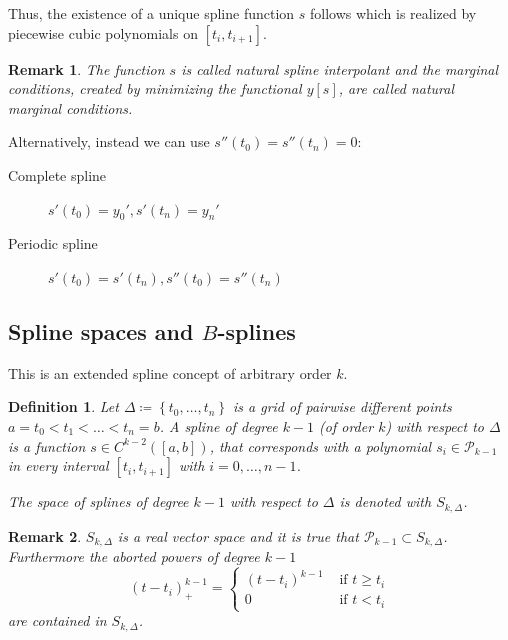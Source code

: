 \documentclass[a4paper]{article}
\newcounter{lecref}[section]
\numberwithin{lecref}{section}
\theoremstyle{break}
\newtheorem{definition}[lecref]{Definition}
\newtheorem*{Remark}{Remark}
\newcommand{\Set}[1]{\left\{#1\right\}}
\begin{document}
Thus, the existence of a unique spline function $s$ follows which is realized by piecewise cubic polynomials on $[t_i, t_{i+1}]$.

\begin{Remark}
  The function $s$ is called \emph{natural spline interpolant} and the marginal conditions, created by minimizing the functional $y[s]$, are called \emph{natural marginal conditions}.
\end{Remark}

Alternatively, instead we can use $s''(t_0) = s''(t_n) = 0$:
\begin{description}
  \item[Complete spline]  $s'(t_0) = y_0', s'(t_n) = y_n'$
  \item[Periodic spline] $s'(t_0) = s'(t_n), s''(t_0) = s''(t_n)$
\end{description}

\subsection{Spline spaces and $B$-splines}

This is an extended spline concept of arbitrary order $k$.

\begin{definition}
  \label{definition:4-19}
  Let $\Delta \coloneqq \Set{t_0, \dots, t_n}$ is a grid of pairwise different points $a = t_0 < t_1 < \dots < t_n = b$.
  A spline of degree $k-1$ (of order $k$) with respect to $\Delta$ is a function $s \in C^{k-2}([a,b])$, that corresponds with a polynomial $s_i \in \mathcal P_{k-1}$ in every interval $[t_i, t_{i+1}]$ with $i = 0, \dots, n-1$.

  The space of splines of degree $k-1$ with respect to $\Delta$ is denoted with $S_{k, \Delta}$.
\end{definition}

\begin{Remark}
  $S_{k,\Delta}$ is a real vector space and it is true that $\mathcal P_{k-1} \subset S_{k,\Delta}$.
  Furthermore the aborted powers of degree $k-1$
  \[
    (t - t_i)_+^{k-1} = \begin{cases}
      (t - t_i)^{k-1} & \text{ if } t \geq t_i \\
      0 & \text{ if } t < t_i
    \end{cases}
  \]
  are contained in $S_{k,\Delta}$.
\end{Remark}
\end{document}
